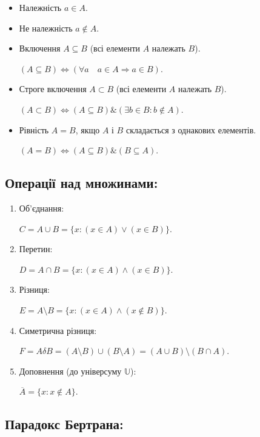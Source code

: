 \begin{itemize}
    \item Належність $a \in A$.
    \item Не належність $a \not\in A$.
    \item Включення $A \subseteq B$ (всі елементи $A$ належать $B$).
    
    $(A \subseteq B) \Leftrightarrow (\forall a \quad a \in A \Rightarrow a \in B)$.

    \item Строге включення $A \subset B$ (всі елементи $A$ належать $B$).
    
    $(A \subset B) \Leftrightarrow (A \subseteq B) \& (\exists b \in B: b \not\in A)$.

    \item Рівність $A = B$, якщо $A$ і $B$ складається з однакових елементів.
    
    $(A = B) \Leftrightarrow (A \subseteq B) \& (B \subseteq A)$.
\end{itemize}

\subsection*{Операції над множинами:}

\begin{enumerate}
    \item Об'єднання:
    
    $C = A \cup B = \{x: (x \in A) \vee (x \in B)\}$.

    \item Перетин:
    
    $D = A \cap B = \{x: (x \in A) \wedge (x \in B)\}$.

    \item Різниця:
    
    $E = A \setminus B = \{x: (x \in A) \wedge (x \not\in B)\}$.

    \item Симетрична різниця:
    
    $F = A \delta B = (A \setminus B) \cup (B \setminus A) = (A \cup B) \setminus (B \cap A)$.

    \item Доповнення (до універсуму $\mathbb{U}$):
    
    $\overline{A} = \{x: x \not\in A\}$.
\end{enumerate}

\subsection*{Парадокс Бертрана:}

